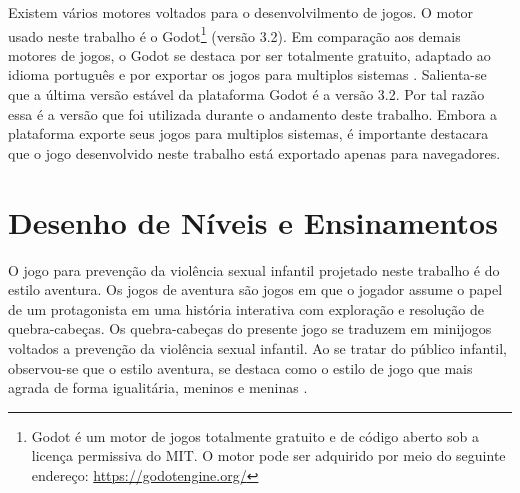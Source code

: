 Existem vários motores voltados para o desenvolvilmento de jogos. O motor usado neste trabalho é o Godot\footnote{Godot é um motor de jogos totalmente gratuito e de código aberto sob a licença permissiva do MIT. O motor pode ser adquirido por meio do seguinte endereço: \url{https://godotengine.org/}} (versão 3.2). Em comparação aos demais motores de jogos, o Godot se destaca por ser totalmente gratuito, adaptado ao idioma português e por exportar os jogos para multiplos sistemas \cite{scherer2020analise}. Salienta-se que a última versão estável da plataforma Godot é a versão 3.2. Por tal razão essa é a versão que foi utilizada durante o andamento deste trabalho. Embora a plataforma exporte seus jogos para multiplos sistemas, é importante destacara que o jogo desenvolvido neste trabalho está exportado apenas para navegadores. %











\section{Desenho de Níveis e Ensinamentos}\label{sec:DN}

O jogo para prevenção da violência sexual infantil projetado neste trabalho é do estilo aventura. Os jogos de aventura são jogos em que o jogador assume o papel de um protagonista em uma história interativa com exploração e resolução de quebra-cabeças. Os quebra-cabeças do presente jogo se traduzem em minijogos voltados a prevenção da violência sexual infantil. Ao se tratar do público infantil, observou-se que o estilo aventura, se destaca como o estilo de jogo que mais agrada de forma igualitária, meninos e meninas \cite{brandtzaeg2009children}. %

